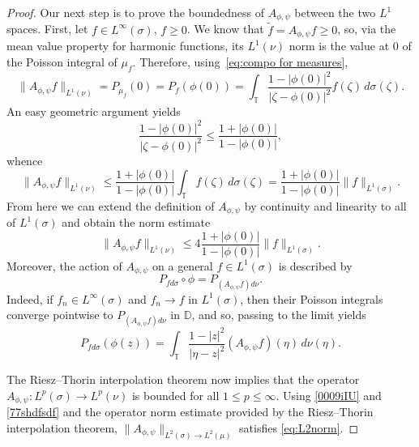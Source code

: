 \documentclass[11pt]{amsart}
\def\D{\mathbb{D}}
\def\T{\mathbb{T}}
\renewcommand{\leq}{\leqslant}
\renewcommand{\geq}{\geqslant}
\numberwithin{equation}{section}
\theoremstyle{plain}
\theoremstyle{definition}
\begin{document}
\begin{proof}
Our next step is to prove the boundedness of $A_{\phi, \psi}$ between the two $L^1$ spaces. First, let $f\in L^\infty(\sigma)$, $f\geq 0$. We know that $\widetilde f= A_{\phi, \psi} f\geq 0$, so, via the mean value property for harmonic functions, its $L^1(\nu)$ norm is the value at $0$ of the Poisson integral  
of $\mu_f$. Therefore, using~\eqref{eq:compo for measures},
\[
\|A_{\phi, \psi} f\|_{L^1(\nu)} =P_{\mu_f}(0)=P_f(\phi(0))
= \int_{\T} \frac{1-|\phi(0)|^2}{|\zeta-\phi(0)|^2} f(\zeta) \,d\sigma(\zeta).
\]
An easy geometric argument yields 
\[
\frac{1-|\phi(0)|^2}{|\zeta-\phi(0)|^2}\leq \frac{1+|\phi(0)|}{1-|\phi(0)|},
\]
whence 
\[
\|A_{\phi, \psi} f\|_{L^1(\nu)}\leq \frac{1+|\phi(0)|}{1-|\phi(0)|}\int_{\T}f(\zeta)\,d\sigma(\zeta) =\frac{1+|\phi(0)|}{1-|\phi(0)|} \|f\|_{L^1(\sigma)}.
\]
From here we can extend the definition of $A_{\phi, \psi}$ by continuity and linearity to all of  $L^1(\sigma)$ and obtain the norm estimate 
\begin{equation}\label{77shdfsdf}
\|A_{\phi, \psi} f\|_{L^1(\nu)}\leq 4 \frac{1+|\phi(0)|}{1-|\phi(0)|} \|f\|_{L^1(\sigma)}.
\end{equation}
Moreover, the action of $A_{\phi, \psi}$ on a general $f \in L^1(\sigma)$ is described by 
$$P_{fd\sigma} \circ \phi=P_{(A_{\phi, \psi} f) d\nu}.$$  Indeed, if $f_n \in L^{\infty}(\sigma)$ and $f_n\to f$ in $L^1(\sigma)$, then their Poisson integrals converge pointwise to $P_{(A_{\phi, \psi} f) d\nu}$ in $\D$, and so, passing to the limit yields
\[
P_{fd\sigma}(\phi(z))=\int_{\T}\frac{1-|z|^2}{|\eta-z|^2}(A_{\phi, \psi} f)(\eta)\, d\nu(\eta).
\]

The Riesz--Thorin interpolation theorem now implies that the operator $A_{\phi, \psi}:L^p(\sigma)\to L^p(\nu)$ is bounded for all $1 \leq p \leq \infty$. Using \eqref{0009iIU} and \eqref{77shdfsdf} and the operator norm estimate provided by the Riesz--Thorin interpolation theorem, $\|A_{\phi, \psi}\|_{L^2(\sigma) \to L^2(\mu)}$ satisfies \eqref{eq:L2norm}. 
\end{proof}
\end{document}
